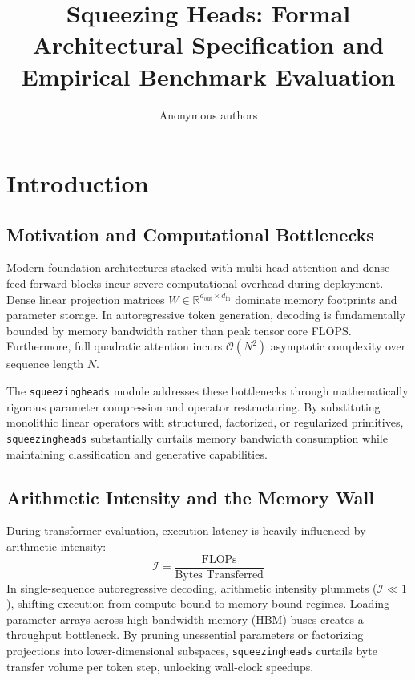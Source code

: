 \title{\textbf{Squeezing Heads: Formal Architectural Specification and Empirical Benchmark Evaluation}}

\author{Anonymous authors}


\section{Introduction}

\subsection{Motivation and Computational Bottlenecks}
Modern foundation architectures stacked with multi-head attention and dense feed-forward blocks incur severe computational overhead during deployment. Dense linear projection matrices $W \in \mathbb{R}^{d_{\text{out}} \times d_{\text{in}}}$ dominate memory footprints and parameter storage. In autoregressive token generation, decoding is fundamentally bounded by memory bandwidth rather than peak tensor core FLOPS. Furthermore, full quadratic attention incurs $\mathcal{O}(N^2)$ asymptotic complexity over sequence length $N$.

The \texttt{squeezingheads} module addresses these bottlenecks through mathematically rigorous parameter compression and operator restructuring. By substituting monolithic linear operators with structured, factorized, or regularized primitives, \texttt{squeezingheads} substantially curtails memory bandwidth consumption while maintaining classification and generative capabilities.

\subsection{Arithmetic Intensity and the Memory Wall}
During transformer evaluation, execution latency is heavily influenced by arithmetic intensity:
\[
\mathcal{I} = \frac{\text{FLOPs}}{\text{Bytes Transferred}}
\]
In single-sequence autoregressive decoding, arithmetic intensity plummets ($\mathcal{I} \ll 1$), shifting execution from compute-bound to memory-bound regimes. Loading parameter arrays across high-bandwidth memory (HBM) buses creates a throughput bottleneck. By pruning unessential parameters or factorizing projections into lower-dimensional subspaces, \texttt{squeezingheads} curtails byte transfer volume per token step, unlocking wall-clock speedups.


